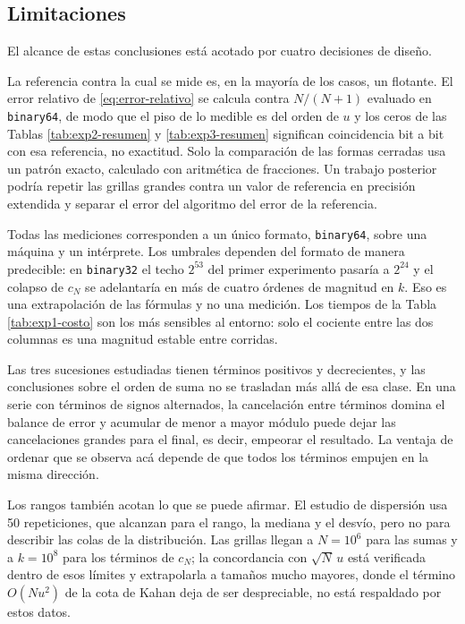 \subsection{Limitaciones}
\label{subsec:limitaciones}

El alcance de estas conclusiones está acotado por cuatro decisiones de diseño.

La referencia contra la cual se mide es, en la mayoría de los casos, un flotante. El error relativo
de \eqref{eq:error-relativo} se calcula contra $N/(N+1)$ evaluado en \texttt{binary64}, de modo que
el piso de lo medible es del orden de $u$ y los ceros de las Tablas \ref{tab:exp2-resumen} y
\ref{tab:exp3-resumen} significan coincidencia bit a bit con esa referencia, no exactitud. Solo la
comparación de las formas cerradas usa un patrón exacto, calculado con aritmética de fracciones. Un
trabajo posterior podría repetir las grillas grandes contra un valor de referencia en precisión
extendida y separar el error del algoritmo del error de la referencia.

Todas las mediciones corresponden a un único formato, \texttt{binary64}, sobre una máquina y un
intérprete. Los umbrales dependen del formato de manera predecible: en \texttt{binary32} el techo
$2^{53}$ del primer experimento pasaría a $2^{24}$ y el colapso de $c_N$ se adelantaría en más de
cuatro órdenes de magnitud en $k$. Eso es una extrapolación de las fórmulas y no una medición. Los
tiempos de la Tabla \ref{tab:exp1-costo} son los más sensibles al entorno: solo el cociente entre
las dos columnas es una magnitud estable entre corridas.

Las tres sucesiones estudiadas tienen términos positivos y decrecientes, y las conclusiones sobre el
orden de suma no se trasladan más allá de esa clase. En una serie con términos de signos alternados,
la cancelación entre términos domina el balance de error y acumular de menor a mayor módulo puede
dejar las cancelaciones grandes para el final, es decir, empeorar el resultado. La ventaja de
ordenar que se observa acá depende de que todos los términos empujen en la misma dirección.

Los rangos también acotan lo que se puede afirmar. El estudio de dispersión usa 50 repeticiones, que
alcanzan para el rango, la mediana y el desvío, pero no para describir las colas de la distribución.
Las grillas llegan a $N = 10^{6}$ para las sumas y a $k = 10^{8}$ para los términos de $c_N$; la
concordancia con $\sqrt{N}\,u$ está verificada dentro de esos límites y extrapolarla a tamaños
mucho mayores, donde el término $O(Nu^{2})$ de la cota de Kahan deja de ser despreciable, no está
respaldado por estos datos.
